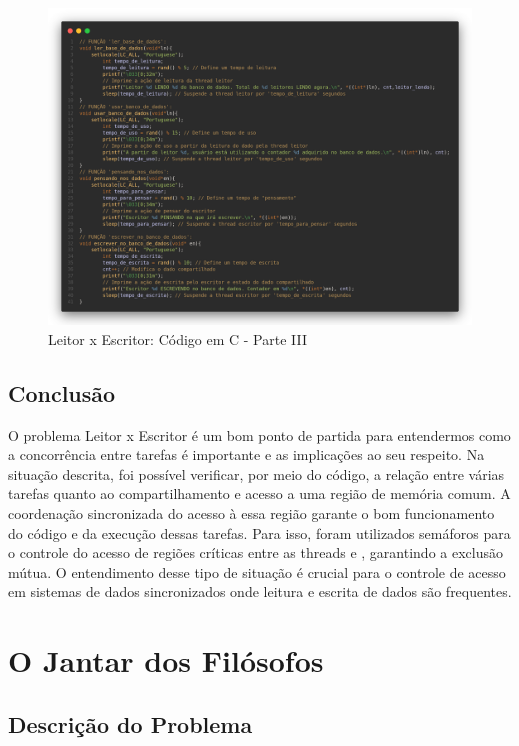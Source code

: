 \documentclass[
	12pt,				%
	openright,			%
	oneside,			%
	a4paper,			%
	chapter=TITLE,		%
	english,			%
	french,				%
	spanish,			%
	brazil				%
	]{abntex2}
\theoremstyle{definition}
\begin{document}
\begin{figure}[ht]
    \centering
    \includegraphics[width=1.0\textwidth]{imagens/leitor_escritor_3.png}
    \caption{Leitor x Escritor: Código em C - Parte III}
    \label{fig:4}
\end{figure}

\clearpage
\section {Conclusão}

O problema Leitor x Escritor é um bom ponto de partida para entendermos como a concorrência entre tarefas é importante e as implicações ao seu respeito. Na situação descrita, foi possível verificar, por meio do código, a relação entre várias tarefas quanto ao compartilhamento e acesso a uma região de memória comum. A coordenação sincronizada do acesso à essa região garante o bom funcionamento do código e da execução dessas tarefas. Para isso, foram utilizados semáforos para o controle do acesso de regiões críticas entre as threads  e , garantindo a exclusão mútua. O entendimento desse tipo de situação é crucial para o controle de acesso em sistemas de dados sincronizados onde leitura e escrita de dados são frequentes.

\chapter{O Jantar dos Filósofos}
\section {Descrição do Problema}
\end{document}
